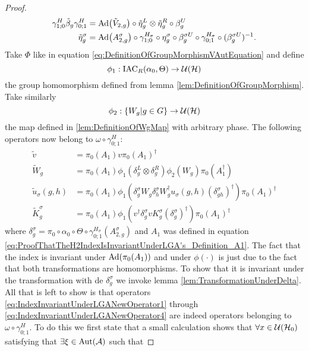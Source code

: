\documentclass[11pt,a4paper,twoside]{article}
\numberwithin{equation}{section}
\begin{document}
\begin{proof}
	\begin{align}
		\label{eq:IndexInvariantUnderLGAEtaTildeDefiniton1}
		\gamma^{H}_{1;0}\tilde{\beta}_g\gamma^{H}_{0;1}&=\Ad{\tilde V_{2,g}}\circ\tilde{\eta}_g^L\otimes\tilde{\eta}_g^R\circ\beta_g^U\\
		\label{eq:IndexInvariantUnderLGAEtaTildeDefiniton2}
		\tilde{\eta}_g^\sigma&=\Ad{A_{2,g}^\sigma}\circ\gamma^{H_\sigma}_{1;0}\circ\eta_g^\sigma\circ\beta_g^{\sigma U}\circ\gamma^{H_\sigma}_{0;1}\circ(\beta_g^{\sigma U})^{-1}.
	\end{align}
	Take $\Phi$ like in equation \eqref{eq:DefinitionOfGroupMorphismVAutEquation} and define
	\begin{equation}
		\phi_1:\textrm{IAC}_R(\alpha_0,\Theta) \rightarrow \mathcal U(\mathcal H)
	\end{equation}
	the group homomorphism defined from lemma \ref{lem:DefinitionOfGroupMorphism}. Take similarly
	\begin{equation}
		\phi_2:\{W_g|g\in G\}\rightarrow \mathcal U(\mathcal H)
	\end{equation}
	the map defined in \ref{lem:DefinitionOfWgMap} with arbitrary phase. The following operators now belong to $\omega\circ\gamma^{H}_{0;1}:$
	\begin{align}
		\label{eq:IndexInvariantUnderLGANewOperator1}
		\tilde{v}&=\pi_0(A_1)v\pi_0(A_1)^\dagger\\
		\label{eq:IndexInvariantUnderLGANewOperator2}
		\tilde{W}_g&=\pi_0(A_1)\phi_1(\delta^L_g\otimes\delta^R_g)\phi_2( W_g)\pi_0(A_1^\dagger)\\
		\label{eq:IndexInvariantUnderLGANewOperator3}
		\tilde u_\sigma(g,h)&=\pi_0(A_1) \phi_1\left(\delta^\sigma_g W_g\delta^\sigma_h W_g^\dagger u_\sigma(g,h)(\delta^\sigma_{gh})^\dagger\right)\pi_0(A_1)^\dagger\\
		\label{eq:IndexInvariantUnderLGANewOperator4}
		\tilde{K}_g^\sigma&=\pi_0(A_1)\phi_1(v^\dagger \delta_g^\sigma v K_g^\sigma (\delta_g^\sigma)^\dagger) \pi_0(A_1)^\dagger
	\end{align}
	where $\delta^\sigma_g=\pi_0\circ\alpha_0\circ\Theta\circ\gamma^{H_\sigma}_{0;1}(A^\sigma_{2,g})$ and $A_1$ was defined in equation \eqref{eq:ProofThatTheH2IndexIsInvariantUnderLGA's_Definition_A1}. The fact that the index is invariant under $\Ad{\pi_0(A_1)}$ and under $\phi(\cdot)$ is just due to the fact that both transformations are homomorphisms. To show that it is invariant under the transformation with de $\delta^\sigma_g$ we invoke lemma \ref{lem:TransformationUnderDelta}. All that is left to show is that operators \eqref{eq:IndexInvariantUnderLGANewOperator1} through \eqref{eq:IndexInvariantUnderLGANewOperator4} are indeed operators belonging to $\omega\circ\gamma^{H}_{0;1}$. To do this we first state that a small calculation shows that $\forall x\in\mathcal U(\mathcal H_0)$ satisfying that $\exists\xi\in\Aut{\AA}$ such that

\end{proof}
\end{document}
